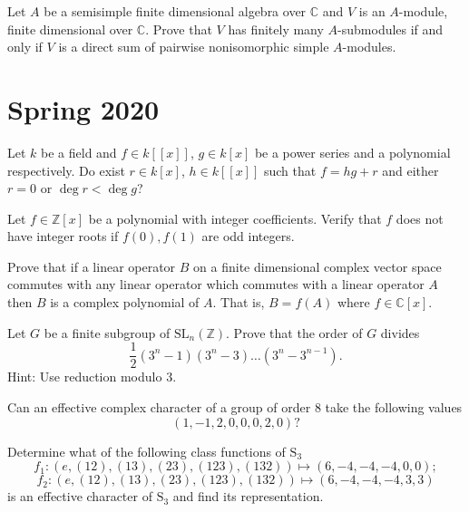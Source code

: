 \documentclass[openany]{book}
\begin{document}
\begin{prob}
    Let \(A\) be a semisimple finite dimensional algebra over \(\mathbb{C}\) and \(V\) is an \(A\)-module, finite dimensional over \(\mathbb{C}\). Prove that \(V\) has finitely many \(A\)-submodules if and only if \(V\) is a direct sum of pairwise nonisomorphic simple \(A\)-modules.
\end{prob}


\chapter{ Spring 2020}


\begin{prob}
    Let \(k\) be a field and \(f\in k[[x]]\), \(g\in k[x]\) be a power series and a polynomial respectively. Do exist \(r\in k[x]\), \(h\in k[[x]]\) such that \(f=hg+r\) and either \(r=0\) or \(\deg r<\deg g\)?
\end{prob}



\begin{prob}
    Let \(f\in\mathbb{Z}[x]\) be a polynomial with integer coefficients. Verify that \(f\) does not have integer roots if \(f(0),f(1)\) are odd integers.
\end{prob}




\begin{prob}
    Prove that if a linear operator \(B\) on a finite dimensional complex vector space commutes with any linear operator which commutes with a linear operator \(A\) then \(B\) is a complex polynomial of \(A\). That is, \(B=f(A)\) where \(f\in\mathbb{C}[x]\).
\end{prob}


\begin{prob}
    Let \(G\) be a finite subgroup of \(\mathrm{SL}_{n}(\mathbb{Z})\). Prove that the order of \(G\) divides \[\frac{1}{2}(3^{n}-1)(3^{n}-3)\ldots(3^{n}-3^{n-1}).\] 
    Hint: Use reduction modulo 3.
\end{prob}



\begin{prob}
    Can an effective complex character of a group of order 8 take the following values 
    \[(1,-1,2,0,0,0,2,0)?\]

\end{prob}



\begin{prob}
    Determine what of the following class functions of \(\mathrm{S}_{3}\)
    \[f_{1}\colon(e,(12),(13),(23),(123),(132))\mapsto(6,-4,-4,-4,0,0);\]
    \[f_{2}\colon(e,(12),(13),(23),(123),(132))\mapsto(6,-4,-4,-4,3,3)\]
    is an effective character of \(\mathrm{S}_{3}\) and find its representation.
\end{prob}
\end{document}
